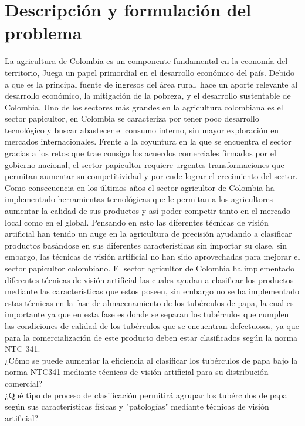 \section{Descripción y formulación del problema}
La agricultura de Colombia es un componente fundamental en la economía del territorio, Juega un papel primordial en el desarrollo económico del país. Debido a que es la principal fuente de ingresos del área rural, hace un aporte relevante al desarrollo económico, la mitigación de la pobreza, y el desarrollo sustentable de Colombia. Uno de los sectores más   grandes en la agricultura colombiana es el sector papicultor, en Colombia se caracteriza por tener poco desarrollo tecnológico y buscar abastecer el consumo interno, sin mayor exploración en mercados internacionales. Frente a la coyuntura en la que se encuentra el sector gracias a los retos que trae consigo los acuerdos comerciales firmados por el gobierno nacional, el sector papicultor requiere urgentes transformaciones que permitan aumentar su competitividad y por ende lograr el crecimiento del sector.
Como consecuencia en los últimos años el sector agricultor de Colombia ha implementado herramientas tecnológicas que le permitan a los agricultores aumentar la calidad de sus productos y así poder competir tanto en el mercado local como en el global. Pensando en esto las diferentes técnicas de visión artificial han tenido un auge en la agricultura de precisión ayudando a clasificar productos basándose en sus diferentes características sin importar su clase, sin embargo, las técnicas de visión artificial no han sido aprovechadas para mejorar el sector papicultor colombiano.
El sector agricultor de Colombia ha implementado diferentes técnicas de visión artificial las cuales ayudan a clasificar los productos mediante las características que estos poseen, sin embargo no se ha implementado estas técnicas en la fase de almacenamiento de los tubérculos de papa, la cual es importante ya que en esta fase es donde se separan los tubérculos que cumplen las condiciones de calidad de los tubérculos que se encuentran defectuosos, ya que para la comercialización de este producto deben estar clasificados según la norma NTC 341.\\ 

¿Cómo se puede aumentar la eficiencia al clasificar los tubérculos de papa bajo la norma NTC341 mediante técnicas de visión artificial para su distribución comercial?\\

¿Qué tipo de proceso de clasificación permitirá agrupar los tubérculos de papa según sus características físicas y "patologías" mediante técnicas de visión artificial?	


